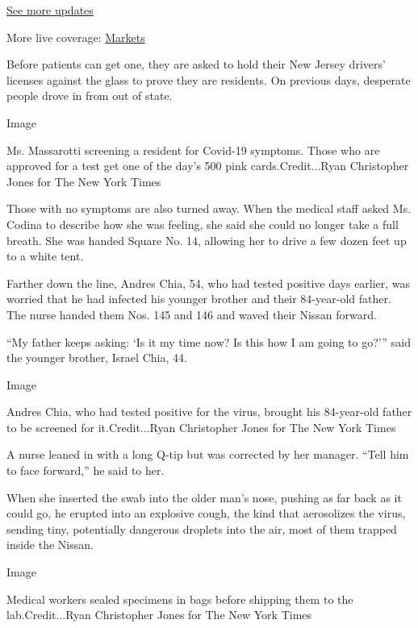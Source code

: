 \href{https://www.nytimes3xbfgragh.onion/2020/09/11/world/covid-19-coronavirus.html?action=click\&pgtype=Article\&state=default\&region=MAIN_CONTENT_1\&context=storylines_live_updates}{See
more updates}

More live coverage:
\href{https://www.nytimes3xbfgragh.onion/live/2020/09/11/business/stock-market-today-coronavirus?action=click\&pgtype=Article\&state=default\&region=MAIN_CONTENT_1\&context=storylines_live_updates}{Markets}

Before patients can get one, they are asked to hold their New Jersey
drivers' licenses against the glass to prove they are residents. On
previous days, desperate people drove in from out of state.

Image

Ms. Massarotti screening a resident for Covid-19 symptoms. Those who are
approved for a test get one of the day's 500 pink cards.Credit...Ryan
Christopher Jones for The New York Times

Those with no symptoms are also turned away. When the medical staff
asked Ms. Codina to describe how she was feeling, she said she could no
longer take a full breath. She was handed Square No. 14, allowing her to
drive a few dozen feet up to a white tent.

Farther down the line, Andres Chia, 54, who had tested positive days
earlier, was worried that he had infected his younger brother and their
84-year-old father. The nurse handed them Nos. 145 and 146 and waved
their Nissan forward.

``My father keeps asking: `Is it my time now? Is this how I am going to
go?''' said the younger brother, Israel Chia, 44.

Image

Andres Chia, who had tested positive for the virus, brought his
84-year-old father to be screened for it.Credit...Ryan Christopher Jones
for The New York Times

A nurse leaned in with a long Q-tip but was corrected by her manager.
``Tell him to face forward,'' he said to her.

When she inserted the swab into the older man's nose, pushing as far
back as it could go, he erupted into an explosive cough, the kind that
aerosolizes the virus, sending tiny, potentially dangerous droplets into
the air, most of them trapped inside the Nissan.

Image

Medical workers sealed specimens in bags before shipping them to the
lab.Credit...Ryan Christopher Jones for The New York Times


